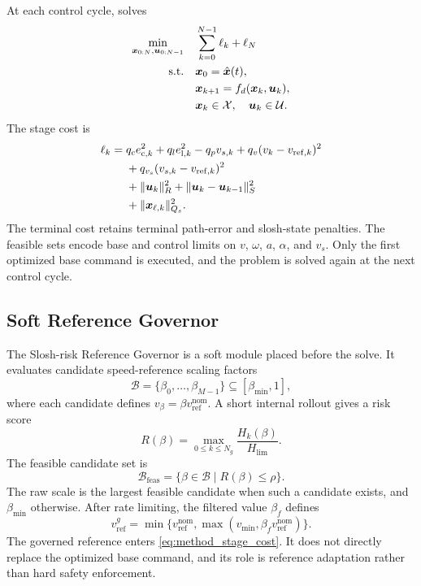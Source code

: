 At each control cycle, \SPMPC{} solves
\begin{equation}
\begin{aligned}
  \min_{\bm{x}_{0:N},\bm{u}_{0:N-1}} \quad
  & \sum_{k=0}^{N-1}\ell_k+\ell_N\\
  \mathrm{s.t.}\quad
  & \bm{x}_0=\hat{\bm{x}}(t),\\
  & \bm{x}_{k+1}=f_d(\bm{x}_k,\bm{u}_k),\\
  & \bm{x}_k\in\mathcal{X},\quad \bm{u}_k\in\mathcal{U}.
\end{aligned}
\label{eq:method_ocp}
\end{equation}
The stage cost is
\begin{equation}
\begin{aligned}
  \ell_k={}&
    q_c e_{\mathrm{c},k}^{2}
    +q_l e_{\mathrm{l},k}^{2}
    -q_p v_{s,k}
    +q_v(v_k-v_{\mathrm{ref},k})^{2}\\
  &+q_{v_s}(v_{s,k}-v_{\mathrm{ref},k})^{2}\\
  &+\|\bm{u}_k\|_R^2
    +\|\bm{u}_k-\bm{u}_{k-1}\|_S^2\\
  &+\|\bm{x}_{\ell,k}\|_{Q_s}^{2}.
\end{aligned}
\label{eq:method_stage_cost}
\end{equation}
The terminal cost retains terminal path-error and slosh-state penalties.
The feasible sets encode base and control limits on $v$, $\omega$, $a$, $\alpha$, and $v_s$.
Only the first optimized base command is executed, and the problem is solved again at the next control cycle.

\subsection{Soft Reference Governor}

The Slosh-risk Reference Governor is a soft module placed before the \MPCC{} solve.
It evaluates candidate speed-reference scaling factors
\begin{equation}
  \mathcal{B}=\{\beta_0,\ldots,\beta_{M-1}\}\subseteq[\beta_{\min},1],
\end{equation}
where each candidate defines $v_\beta=\beta v_{\mathrm{ref}}^{\mathrm{nom}}$.
A short internal rollout gives a risk score
\begin{equation}
  R(\beta)=
  \max_{0\leq k\leq N_g}
  \frac{H_k(\beta)}{H_{\lim}}.
\end{equation}
The feasible candidate set is
\begin{equation}
  \mathcal{B}_{\mathrm{feas}}
  =
  \{\beta\in\mathcal{B}\mid R(\beta)\leq \rho\}.
\end{equation}
The raw scale is the largest feasible candidate when such a candidate exists, and $\beta_{\min}$ otherwise.
After rate limiting, the filtered value $\beta_f$ defines
\begin{equation}
  v_{\mathrm{ref}}^g
  =
  \min\{v_{\mathrm{ref}}^{\mathrm{nom}},
  \max(v_{\min},\beta_f v_{\mathrm{ref}}^{\mathrm{nom}})\}.
\end{equation}
The governed reference enters \eqref{eq:method_stage_cost}.
It does not directly replace the optimized base command, and its role is reference adaptation rather than hard safety enforcement.
